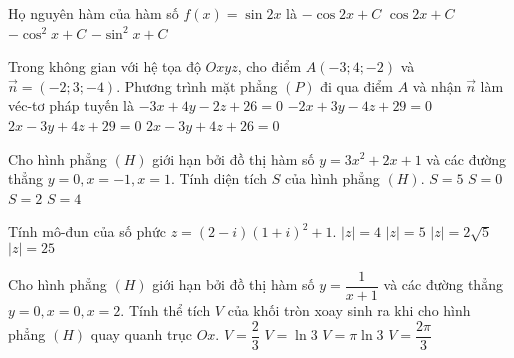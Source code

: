 \begin{ex}%
Họ nguyên hàm của hàm số $f(x)=\sin 2x$ là	
\choice
{$-\cos 2x +C$}
{$\cos 2x +C$}
{\True $-\cos^2 x+C$}
{$-\sin^2 x+C$}

\end{ex}


\begin{ex}%
Trong không gian với hệ tọa độ $Oxyz$, cho điểm $A(-3;4;-2)$ và $\overrightarrow{n}=(-2;3;-4)$. Phương trình mặt phẳng $(P)$ đi qua điểm $A$ và nhận $\overrightarrow{n}$ làm véc-tơ pháp tuyến là
\choice
{$-3x+4y-2z+26=0$}
{$-2x+3y-4z+29=0$}
{$2x-3y+4z+29=0$}
{\True $2x-3y+4z+26=0$}

\end{ex}


\begin{ex}%
Cho hình phẳng $(H)$ giới hạn bởi đồ thị hàm số $y=3x^2+2x+1$ và các đường thẳng $y=0,x=-1,x=1$. Tính diện tích $S$ của hình phẳng $(H)$.
\choice
{$S=5$}
{$S=0$}
{$S=2$}
{\True $S=4$}

\end{ex}


\begin{ex}%
Tính mô-đun của số phức $z=(2-i)(1+i)^2+1$.
\choice
{$|z|=4$}
{\True $|z|=5$}
{$|z|=2\sqrt{5}$}
{$|z|=25$}

\end{ex}


\begin{ex}%
Cho hình phẳng $(H)$ giới hạn bởi đồ thị hàm số $y=\dfrac{1}{x+1}$ và các đường thẳng $y=0,x=0,x=2$. Tính thể tích $V$ của khối tròn xoay sinh ra khi cho hình phẳng $(H)$ quay quanh trục $Ox$.
\choice
{$V=\dfrac{2}{3}$}
{$V=\ln 3$}
{$V=\pi \ln3$}
{\True $V=\dfrac{2\pi}{3}$}

\end{ex}


